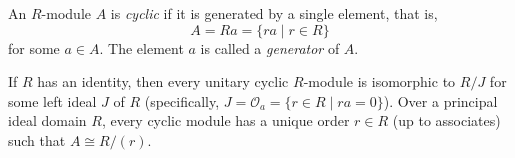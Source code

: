 An $R$-module $A$ is \emph{cyclic} if it is generated by a single element, that is,
\[
A = Ra = \{ra \mid r \in R\}
\]
for some $a \in A$. The element $a$ is called a \emph{generator} of $A$.

If $R$ has an identity, then every unitary cyclic $R$-module is isomorphic to $R/J$ for some left ideal $J$ of $R$ (specifically, $J = \mathcal{O}_a = \{r \in R \mid ra = 0\}$). Over a principal ideal domain $R$, every cyclic module has a unique order $r \in R$ (up to associates) such that $A \cong R/(r)$.

